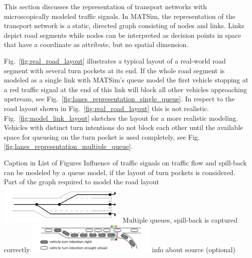 This section discusses the representation of transport networks with microscopically modeled traffic signals. 
In MATSim, the representation of the transport network is a static, directed graph consisting of nodes and links. 
Links depict road segments while nodes can be interpreted as decision points in space that have a coordinate as attribute, but no spatial dimension. 


Fig.~\ref{fig:real_road_layout} illustrates a typical layout of a real-world road segment with several turn pockets at its end. 
If the whole road segment is modeled as a single link with MATSim's queue model the first vehicle stopping at a red traffic signal at the end of this link will block all other vehicles approaching upstream, see Fig.~\ref{fig:lanes_representation_single_queue}. 
In respect to the road layout shown in Fig.~\ref{fig:real_road_layout} this is not realistic. 
Fig.~\ref{fig:model_link_layout} sketches the layout for a more realistic modeling. 
Vehicles with distinct turn intentions do not block each other until the available space for queueing on the turn pocket is used completely, see Fig.\ref{fig:lanes_representation_multiple_queue}. 

\createfigure%
{Caption in List of Figures}%
{Influence of traffic signals on traffic flow and spill-back can be modeled by a queue model, if the layout of turn pockets is considered.}
{\label{fig:lanes_representation}}%
{%
  \createsubfigure%
	{Part of the graph required to model the road layout}
	{\includegraphics[width=0.475\textwidth]{extending/figures/signalslanes/link_lanes_layout}}
	{\label{fig:model_link_layout}}
  \createsubfigure%
	{Multiple queues, spill-back is captured correctly}%
	{\includegraphics[width=0.48\textwidth]{extending/figures/signalslanes/multiple_queue_model_inkscape.pdf}}%
	{\label{fig:lanes_representation_multiple_queue}}%
}%
{info about source (optional)}

